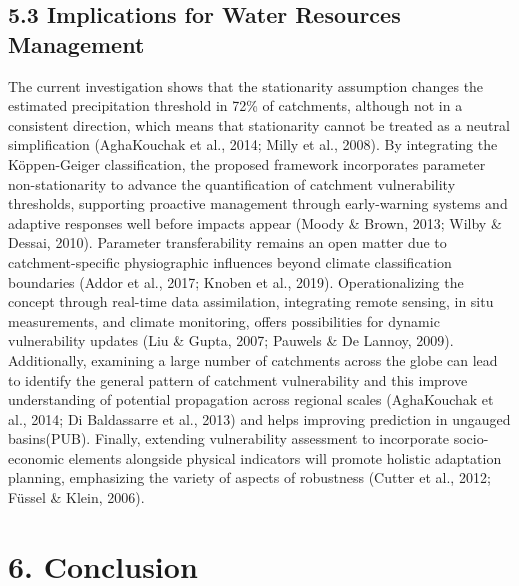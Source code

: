 \documentclass[
]{article}
\begin{document}
\subsection{\texorpdfstring{5.3 Implications for Water Resources
Management
}{5.3 Implications for Water Resources Management }}\label{implications-for-water-resources-management}

The current investigation shows that the stationarity assumption changes
the estimated precipitation threshold in 72\% of catchments, although
not in a consistent direction, which means that stationarity cannot be
treated as a neutral simplification (AghaKouchak et al., 2014; Milly et
al., 2008). By integrating the Köppen-Geiger classification, the
proposed framework incorporates parameter non-stationarity to advance
the quantification of catchment vulnerability thresholds, supporting
proactive management through early-warning systems and adaptive
responses well before impacts appear (Moody \& Brown, 2013; Wilby \&
Dessai, 2010). Parameter transferability remains an open matter due to
catchment-specific physiographic influences beyond climate
classification boundaries (Addor et al., 2017; Knoben et al., 2019).
Operationalizing the concept through real-time data assimilation,
integrating remote sensing, in situ measurements, and climate
monitoring, offers possibilities for dynamic vulnerability updates (Liu
\& Gupta, 2007; Pauwels \& De Lannoy, 2009). Additionally, examining a
large number of catchments across the globe can lead to identify the
general pattern of catchment vulnerability and this improve
understanding of potential propagation across regional scales
(AghaKouchak et al., 2014; Di Baldassarre et al., 2013) and helps
improving prediction in ungauged basins(PUB). Finally, extending
vulnerability assessment to incorporate socio-economic elements
alongside physical indicators will promote holistic adaptation planning,
emphasizing the variety of aspects of robustness (Cutter et al., 2012;
Füssel \& Klein, 2006).

\section{6. Conclusion}\label{conclusion}
\end{document}
